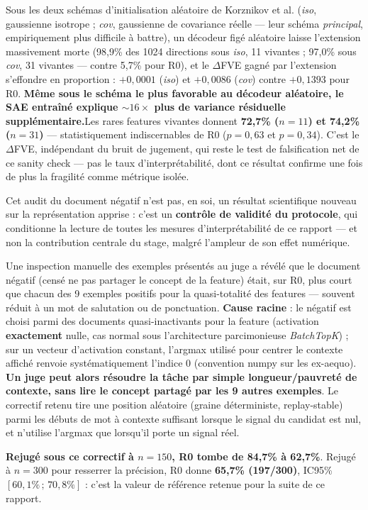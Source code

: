 \documentclass[11pt]{article}
\begin{document}
Sous les deux schémas d'initialisation aléatoire de Korznikov et al.
(\emph{iso}, gaussienne isotrope ; \emph{cov}, gaussienne de covariance
réelle --- leur schéma \emph{principal}, empiriquement plus difficile à
battre), un décodeur figé aléatoire laisse l'extension
massivement morte (98,9\% des 1024 directions sous \emph{iso}, 11 vivantes ;
97,0\% sous \emph{cov}, 31 vivantes --- contre 5,7\% pour R0), et le
$\Delta$FVE gagné par l'extension s'effondre en proportion : $+0{,}0001$
(\emph{iso}) et $+0{,}0086$ (\emph{cov}) contre $+0{,}1393$ pour R0. \textbf{Même sous le
schéma le plus favorable au décodeur aléatoire, le SAE entraîné explique
${\sim}16\times$ plus de variance résiduelle supplémentaire.}Les rares features vivantes donnent
\textbf{72,7\% ($n=11$) et 74,2\% ($n=31$)} --- statistiquement indiscernables
de R0 ($p=0{,}63$ et $p=0{,}34$). C'est le $\Delta$FVE, indépendant du bruit de
jugement, qui reste le test de
falsification net de ce sanity check --- pas le taux d'interprétabilité,
dont ce résultat confirme une fois de plus la fragilité comme métrique
isolée.

Cet audit du document négatif n'est pas, en soi, un résultat scientifique
nouveau sur la représentation apprise : c'est un \textbf{contrôle de
validité du protocole}, qui conditionne la lecture de toutes les mesures
d'interprétabilité de ce rapport --- et non la contribution centrale du
stage, malgré l'ampleur de son effet numérique.

\begin{resultbox}
Une inspection manuelle des exemples présentés au juge a révélé que le
document \og{}négatif\fg{} (censé ne pas partager le concept de la feature)
était, sur R0, plus court que chacun des 9 exemples positifs pour la
quasi-totalité des features --- souvent réduit à un mot de salutation ou de
ponctuation. \textbf{Cause racine} : le négatif est choisi parmi des
documents quasi-inactivants pour la feature (activation \textbf{exactement}
nulle, cas normal sous l'architecture parcimonieuse \emph{BatchTopK}) ; sur
un vecteur d'activation constant, l'argmax utilisé pour centrer le contexte
affiché renvoie systématiquement l'indice 0 (convention numpy sur les ex-aequo). \textbf{Un juge
peut alors résoudre la tâche par simple longueur/pauvreté de contexte, sans
lire le concept partagé par les 9 autres exemples}. Le correctif retenu
tire une position aléatoire (graine déterministe, replay-stable) parmi les
débuts de mot à contexte suffisant lorsque le signal du candidat est nul, et
n'utilise l'argmax que lorsqu'il porte un signal réel.

\textbf{Rejugé sous ce correctif à $n=150$, R0 tombe de 84,7\% à 62,7\%}. Rejugé à $n=300$ pour
resserrer la précision, R0 donne \textbf{65,7\% (197/300)}, IC95\%
$[60{,}1\%\,;\,70{,}8\%]$ : c'est la valeur de référence retenue pour la suite de
ce rapport.
\end{resultbox}
\end{document}
